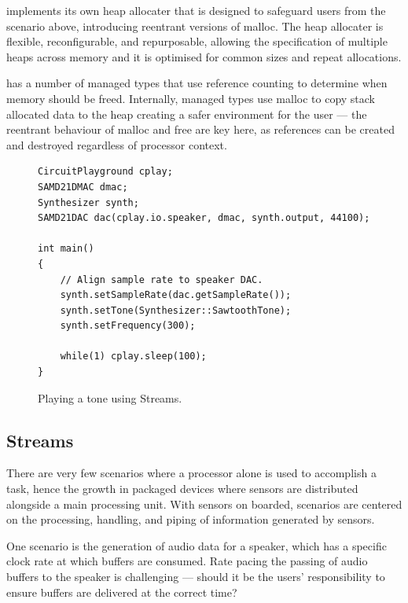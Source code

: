 \CO implements its own heap allocater that is designed to safeguard users from the scenario above, introducing reentrant versions of malloc. The heap allocater is flexible, reconfigurable, and repurposable, allowing the specification of multiple heaps across memory and it is optimised for common sizes and repeat allocations.

\CO has a number of managed types that use reference counting to determine when memory should be freed. Internally, managed types use malloc to copy stack allocated data to the heap creating a safer environment for the user --- the reentrant behaviour of malloc and free are key here, as references can be created and destroyed regardless of processor context.

\begin{figure}
\begin{lstlisting}
CircuitPlayground cplay;
SAMD21DMAC dmac;
Synthesizer synth;
SAMD21DAC dac(cplay.io.speaker, dmac, synth.output, 44100);

int main()
{
    // Align sample rate to speaker DAC.
    synth.setSampleRate(dac.getSampleRate());
    synth.setTone(Synthesizer::SawtoothTone);
    synth.setFrequency(300);

    while(1) cplay.sleep(100);
}
\end{lstlisting}
\caption{\label{fig:play}Playing a tone using Streams.}
\end{figure}

\subsection{Streams}
There are very few scenarios where a processor alone is used to accomplish a task, hence the growth in packaged devices where sensors are distributed alongside a main processing unit. With sensors on boarded, scenarios are centered on the processing, handling, and piping of information generated by sensors.

One scenario is the generation of audio data for a speaker, which has a specific clock rate at which buffers are consumed. Rate pacing the passing of audio buffers to the speaker is challenging --- should it be the users' responsibility to ensure buffers are delivered at the correct time?

